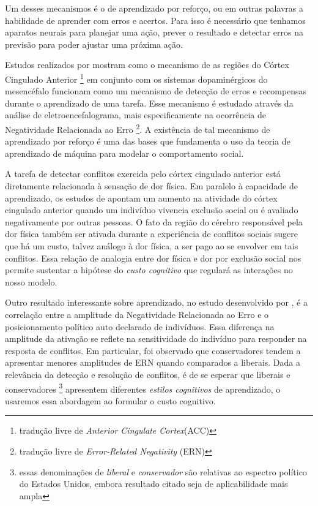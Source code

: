 Um desses mecanismos é o de aprendizado por reforço, ou em outras palavras a habilidade de aprender com erros e acertos.
Para isso é necessário que tenhamos aparatos neurais para planejar uma ação, prever o resultado e detectar erros na previsão para poder ajustar uma próxima ação.

Estudos realizados por \parencite{Holroyd2002a} mostram como o mecanismo de as regiões do Córtex Cingulado Anterior \footnote{tradução livre de \emph{Anterior Cingulate Cortex}(ACC)} em conjunto com os sistemas dopaminérgicos do mesencéfalo funcionam como um mecanismo de detecção de erros e recompensas durante o aprendizado de uma tarefa.
Esse mecanismo é estudado através da análise de eletroencefalograma, mais especificamente na ocorrência de Negatividade Relacionada ao Erro \footnote{tradução livre de \emph{Error-Related Negativity} (ERN)}.
A existência de tal mecanismo de aprendizado por reforço é uma das bases que fundamenta o uso da teoria de aprendizado de máquina para modelar o comportamento social.

A tarefa de detectar conflitos exercida pelo córtex cingulado anterior está diretamente relacionada à sensação de dor física.
Em paralelo à capacidade de aprendizado, os estudos de \parencite{Somerville2006,Eisenberger2003} apontam um aumento na atividade do córtex cingulado anterior quando um indivíduo vivencia exclusão social ou é avaliado negativamente por outras pessoas.
O fato da região do cérebro responsável pela dor física também ser ativada durante a experiência de conflitos sociais sugere que há um custo, talvez análogo à dor física, a ser pago ao se envolver em tais conflitos.
Essa relação de analogia entre dor física e dor por exclusão social nos permite sustentar a hipótese do \emph{custo cognitivo} que regulará as interações no nosso modelo.

Outro resultado interessante sobre aprendizado, no estudo desenvolvido por \parencite{Amodio2007}, é a correlação entre a amplitude da Negatividade Relacionada ao Erro e o posicionamento político auto declarado de indivíduos.
Essa diferença na amplitude da ativação se reflete na sensitividade do indivíduo para responder na resposta de conflitos.
Em particular, foi observado que conservadores tendem a apresentar menores amplitudes de ERN quando comparados a liberais.
Dada a relevância da detecção e resolução de conflitos, é de se esperar que liberais e conservadores \footnote{essas denominações de \emph{liberal} e \emph{conservador} são relativas ao espectro político do Estados Unidos, embora resultado citado seja de aplicabilidade mais ampla} apresentem diferentes \emph{estilos cognitivos} de aprendizado, o usaremos essa abordagem ao formular o custo cognitivo.

